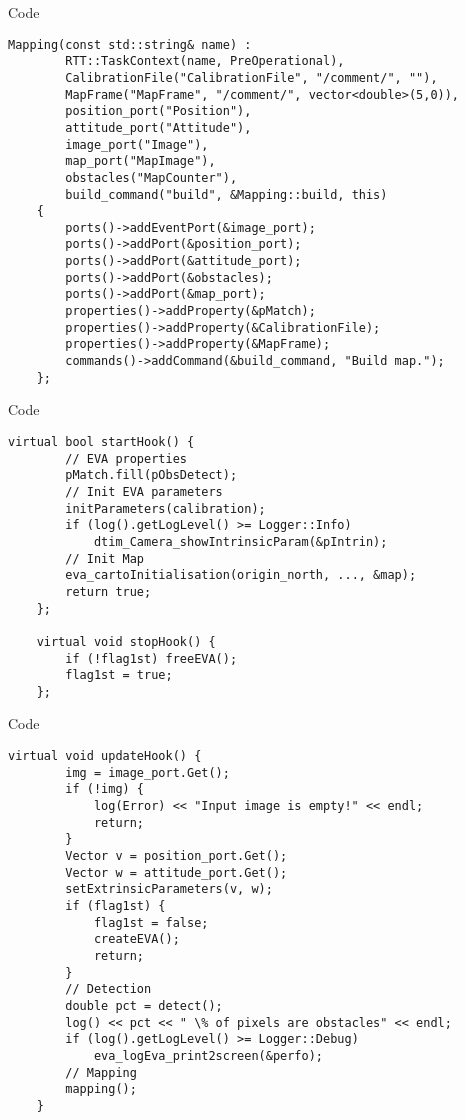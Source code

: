 \documentclass[compress]{beamer}
\begin{document}
\begin{frame}[containsverbatim]{Code}
\lstset{language=C++,basicstyle=\tiny,tabsize=3}
\begin{lstlisting}[frame=trBL]
	Mapping(const std::string& name) :
		RTT::TaskContext(name, PreOperational),
		CalibrationFile("CalibrationFile", "/comment/", ""),
		MapFrame("MapFrame", "/comment/", vector<double>(5,0)),
		position_port("Position"),
		attitude_port("Attitude"),
		image_port("Image"),
		map_port("MapImage"),
		obstacles("MapCounter"),
		build_command("build", &Mapping::build, this)
	{
		ports()->addEventPort(&image_port);
		ports()->addPort(&position_port);
		ports()->addPort(&attitude_port);
		ports()->addPort(&obstacles);
		ports()->addPort(&map_port);
		properties()->addProperty(&pMatch);
		properties()->addProperty(&CalibrationFile);
		properties()->addProperty(&MapFrame);
		commands()->addCommand(&build_command, "Build map."); 
	};
\end{lstlisting}
\end{frame}

\begin{frame}[containsverbatim]{Code}
\lstset{language=C++,basicstyle=\tiny,tabsize=3}
\begin{lstlisting}[frame=trBL]
	virtual bool startHook() {
		// EVA properties
		pMatch.fill(pObsDetect);
		// Init EVA parameters
		initParameters(calibration);
		if (log().getLogLevel() >= Logger::Info)
			dtim_Camera_showIntrinsicParam(&pIntrin);
		// Init Map
		eva_cartoInitialisation(origin_north, ..., &map);
		return true;
	};
	
	virtual void stopHook() {
		if (!flag1st) freeEVA();
		flag1st = true;
	};
\end{lstlisting}
\end{frame}

\begin{frame}[containsverbatim]{Code}
\lstset{language=C++,basicstyle=\tiny,tabsize=3}
\begin{lstlisting}[frame=trBL]
	virtual void updateHook() {
		img = image_port.Get();
		if (!img) {
			log(Error) << "Input image is empty!" << endl;
			return;
		}
		Vector v = position_port.Get();
		Vector w = attitude_port.Get();
		setExtrinsicParameters(v, w);
		if (flag1st) {
			flag1st = false;
			createEVA();
			return;
		}
		// Detection
		double pct = detect();
		log() << pct << " \% of pixels are obstacles" << endl;
		if (log().getLogLevel() >= Logger::Debug)
			eva_logEva_print2screen(&perfo);
		// Mapping
		mapping();
	}
\end{lstlisting}
\end{frame}
\end{document}
